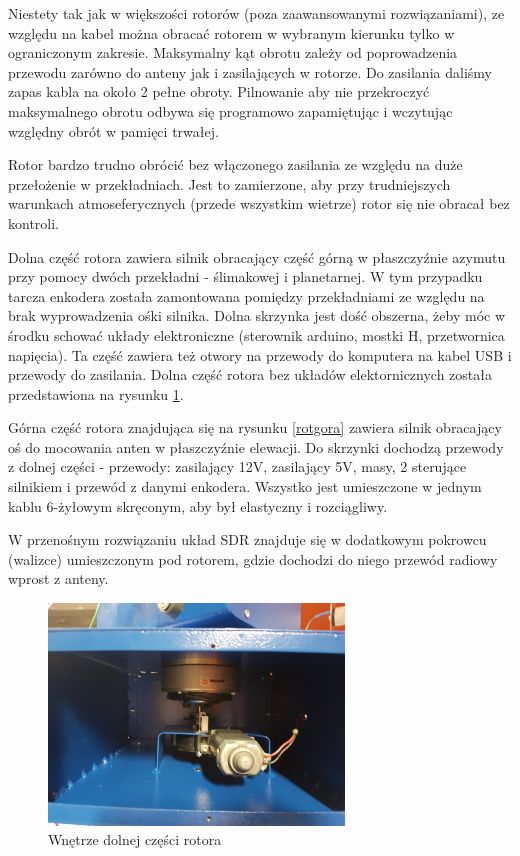 Niestety tak jak w większości rotorów (poza zaawansowanymi rozwiązaniami), ze względu na kabel można obracać rotorem w wybranym kierunku tylko w ograniczonym zakresie. Maksymalny kąt obrotu zależy od poprowadzenia przewodu zarówno do anteny jak i zasilających w rotorze. Do zasilania daliśmy zapas kabla na około 2 pełne obroty. Pilnowanie aby nie przekroczyć maksymalnego obrotu odbywa się programowo zapamiętując i wczytując względny obrót w pamięci trwałej. 

Rotor bardzo trudno obrócić bez włączonego zasilania ze względu na duże przełożenie w przekładniach. Jest to zamierzone, aby przy trudniejszych warunkach atmoseferycznych (przede wszystkim wietrze) rotor się nie obracał bez kontroli.

Dolna część rotora zawiera silnik obracający część górną w płaszczyźnie azymutu przy pomocy dwóch przekładni - ślimakowej i planetarnej. W tym przypadku tarcza enkodera została zamontowana pomiędzy przekładniami ze względu na brak wyprowadzenia ośki silnika. Dolna skrzynka jest dość obszerna, żeby móc w środku schować układy elektroniczne (sterownik arduino, mostki H, przetwornica napięcia). Ta część zawiera też otwory na przewody do komputera na kabel USB i przewody do zasilania. Dolna część rotora bez układów elektornicznych została przedstawiona na rysunku \ref{rotdol}.

Górna część rotora znajdująca się na rysunku \ref{rotgora} zawiera silnik obracający oś do mocowania anten w płaszczyźnie elewacji. Do skrzynki dochodzą przewody z dolnej części - przewody: zasilający 12V, zasilający 5V, masy, 2 sterujące silnikiem i przewód z danymi enkodera. Wszystko jest umieszczone w jednym kablu 6-żyłowym skręconym, aby był elastyczny i rozciągliwy. 

W przenośnym rozwiązaniu układ SDR znajduje się w dodatkowym pokrowcu (walizce) umieszczonym pod rotorem, gdzie dochodzi do niego przewód radiowy wprost z anteny.

\begin{figure}[!htbp]
 \includegraphics[width=0.7\textwidth]{rotor_dol}
 \centering
 \caption{Wnętrze dolnej części rotora}
 \label{rotdol}
\end{figure}

